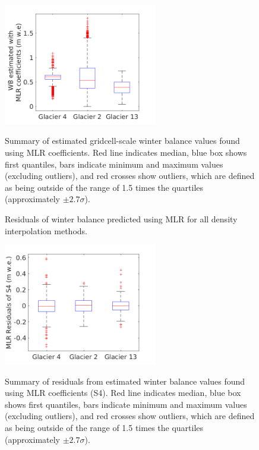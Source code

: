 \documentclass{sfuthesis}
\newcommand{\boxMatlab}{Red line indicates median, blue box shows first quantiles, bars indicate minimum and maximum values (excluding outliers), and red crosses show outliers, which are defined as being outside of the range of 1.5 times the quartiles (approximately $\pm2.7\sigma$). }
\begin{document}
\begin{figure}
\centering
	\includegraphics[width =0.6\textwidth]{ModelledSWE_box_MLR.png}\\
\caption{Summary of estimated gridcell-scale winter balance values found using MLR coefficients. \boxMatlab}
\label{fig:MLRsweboxplot}
\end{figure} 


\begin{figure}[H]
	\caption{Residuals of winter balance predicted using MLR for all density interpolation methods.}
	\label{fig:MLRresiduals_all}
\end{figure}

\begin{figure}[H]
\centering
	\includegraphics[width =0.6\textwidth]{residuals_box_MLR.png}\\
\caption{Summary of residuals from estimated winter balance values found using MLR coefficients (S4). \boxMatlab}
\label{fig:MLRresidualsboxplot}
\end{figure} 
\end{document}
